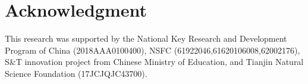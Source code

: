 \documentclass[10pt,journal,cspaper,compsoc]{IEEEtran}
\begin{document}
\section*{Acknowledgment}
This research was supported by the National Key Research and 
Development Program of China (2018AAA0100400), 
NSFC (61922046,61620106008,62002176), 
S\&T innovation project from Chinese Ministry of Education,
and Tianjin Natural Science Foundation (17JCJQJC43700).






\ifCLASSOPTIONcaptionsoff
  \newpage
\fi
\newcommand{\AddPhoto}[1]{\includegraphics [width=1in,height=1.25in,clip,keepaspectratio]{figures/photos/#1}}





\vfill
\end{document}
